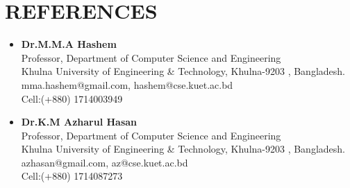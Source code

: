 \documentclass[11pt,a4paper,roman]{moderncv}        %
\begin{document}
\section{REFERENCES}
\begin{itemize}
    \item \textbf{Dr.M.M.A Hashem}\\
    Professor, Department of Computer Science and Engineering\\
    Khulna University of Engineering \& Technology, Khulna-9203 , Bangladesh.\\
    mma.hashem@gmail.com, hashem@cse.kuet.ac.bd\\
    Cell:(+880) 1714003949
    
    \vspace{2mm}
     \item \textbf{Dr.K.M Azharul Hasan}\\
    Professor, Department of Computer Science and Engineering\\
    Khulna University of Engineering \& Technology, Khulna-9203 , Bangladesh.\\
    azhasan@gmail.com, az@cse.kuet.ac.bd\\
    Cell:(+880) 1714087273
    
\end{itemize}
      

\nocite{*}



\end{document}
